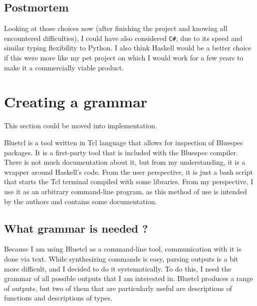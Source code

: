 \documentclass[12pt]{report}
\begin{document}
\subsection{Postmortem}
Looking at those choices now (after finishing the project and knowing all encountered difficulties), I could have also considered \verb!C#!, due to its speed and similar typing flexibility to Python. I also think Haskell would be a better choice if this were more like my pet project on which I would work for a few years to make it a commercially viable product.  
  
\section{Creating a grammar}  
This section could be moved into implementation.  
  
\begin{tcolorbox}[title=Bluetcl]  
  Bluetcl is a tool written in Tcl language that allows for inspection of Bluespec packages. It is a first-party tool that is included with the Bluespec compiler. There is not much documentation about it, but from my understanding, it is a wrapper around Haskell's code.  
  From the user perspective, it is just a bash script that starts the Tcl terminal compiled with some libraries. From my perspective, I use it as an arbitrary command-line program, as this method of use is intended by the authors and contains some documentation.  
\end{tcolorbox} 
\subsection{What grammar is needed ?}
Because I am using Bluetcl as a command-line tool, communication with it is done via text.  
While synthesizing commands is easy, parsing outputs is a bit more difficult, and I decided to do it systematically.  
To do this, I need the grammar of all possible outputs that I am interested in.  
Bluetcl produces a range of outputs, but two of them that are particularly useful are descriptions of functions and descriptions of types.  
\end{document}
